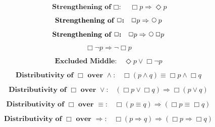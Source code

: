 \documentclass[fleqn, leqno]{article}
\newcommand{\impl}{\ensuremath{\Rightarrow}}        %
\newcommand{\Next}{\;\,\text{\raisebox{3.5pt}{\circle{6}}}}
\newcommand{\Event}{\Diamond}
\newcommand{\Always}{\Box}
\newcommand{\spacer}{\vspace{-30pt}}
\begin{document}
\begin{equation}\label{E:impAlwaysE}
\textbf{Strengthening of $\Always$:}\quad \Always p \impl \Event p
\end{equation}

\spacer

\begin{equation}\label{E:impAlwaysN}
\textbf{Strengthening of $\Always$:}\quad \Always p \impl \Next p
\end{equation}

\spacer

\begin{equation}\label{E:impAlwaysNA}
\textbf{Strengthening of $\Always$:}\quad \Always p \impl \Next\Always p
\end{equation}

\spacer

\begin{equation}\label{E:exAlwaysNot}
\Always\neg p \impl \neg\Always p
\end{equation}

\spacer

\begin{equation}\label{E:excludedMid}
\textbf{Excluded Middle:}\quad \Event p \lor \Always\neg p
\end{equation}

\spacer

\begin{equation}\label{E:distAlwaysAnd}
\textbf{Distributivity of $\Always$ over $\land$:}\quad \Always (p \land q) \equiv \Always p \land \Always q
\end{equation}

\spacer

\begin{equation}\label{E:distAlwaysOr}
\textbf{Distributivity of $\Always$ over $\lor$:}\quad (\Always p \lor \Always q) \impl \Always (p \lor q)
\end{equation}

\spacer

\begin{equation}\label{E:distAlwaysEquiv}
\textbf{Distributivity of $\Always$ over $\equiv$:}\quad \Always (p \equiv q) \impl (\Always p \equiv \Always q)
\end{equation}

\spacer

\begin{equation}\label{E:distAlwaysImp}
\textbf{Distributivity of $\Always$ over $\impl$:}\quad \Always (p \impl q) \impl (\Always p \impl \Always q)
\end{equation}
\end{document}

